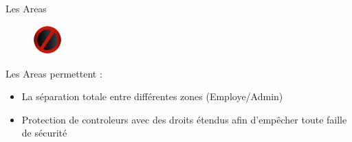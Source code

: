 \begin{frame}{Les Areas}
\begin{figure}[h!]
  \includegraphics[width=0.10\textwidth]{images/no__not__stop__wrong-512}
\end{figure}
  Les Areas permettent :
  \begin{itemize}
  \item La séparation totale entre différentes zones (Employe/Admin)
  \item Protection de controleurs avec des droits étendus afin d'empêcher toute faille de sécurité
  \end{itemize}
\end{frame}